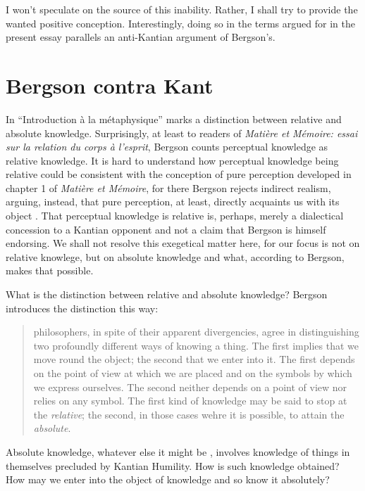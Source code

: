 I won't speculate on the source of this inability. Rather, I shall try to provide the wanted positive conception. Interestingly, doing so in the terms argued for in the present essay parallels an anti-Kantian argument of Bergson's.


\section{Bergson contra Kant} %
\label{sec:bergson_contra_kant}

In ``Introduction \`{a} la m\'{e}taphysique'' \citet{Bergson:1903nx} marks a distinction between relative and absolute knowledge. Surprisingly, at least to readers of \emph{Mati\`{e}re et M\'{e}moire: essai sur la relation du corps \`{a} l'esprit}, Bergson counts perceptual knowledge as relative knowledge. It is hard to understand how perceptual knowledge being relative could be consistent with the conception of pure perception developed in chapter 1 of \emph{Mati\`{e}re et M\'{e}moire}, for there Bergson rejects indirect realism, arguing, instead, that pure perception, at least, directly acquaints us with its object \citep[though see][for a reconciliationist reading, 39--41]{Moore:1996rt}. That perceptual knowledge is relative is, perhaps, merely a dialectical concession to a Kantian opponent and not a claim that Bergson is himself endorsing. We shall not resolve this exegetical matter here, for our focus is not on relative knowlege, but on absolute knowledge and what, according to Bergson, makes that possible.

What is the distinction between relative and absolute knowledge? Bergson introduces the distinction this way:
\begin{quote}
	philosophers, in spite of their apparent divergencies, agree in distinguishing two profoundly different ways of knowing a thing. The first implies that we move round the object; the second that we enter into it. The first depends on the point of view at which we are placed and on the symbols by which we express ourselves. The second neither depends on a point of view nor relies on any symbol. The first kind of knowledge may be said to stop at the \emph{relative}; the second, in those cases wehre it is possible, to attain the \emph{absolute}. \citep[1]{Bergson:1912ud}
\end{quote}
Absolute knowledge, whatever else it might be \citep[for discussion see][chapter 6]{Lacey:1989bv}, involves knowledge of things in themselves precluded by Kantian Humility. How is such knowledge obtained? How may we enter into the object of knowledge and so know it absolutely?


